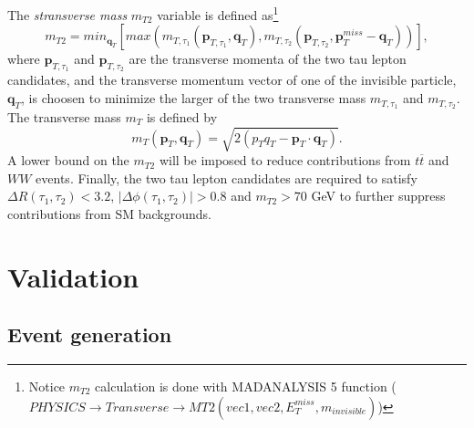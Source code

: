 \documentclass{ws-mpla}
\begin{document}
The \textit{stransverse mass} $m_{T2}$ variable is defined as\footnote{
Notice $m_{T2}$ calculation is done with MADANALYSIS 5 function ($PHYSICS\rightarrow Transverse\rightarrow MT2(vec1,vec2,E^{miss}_T,m_{invisible})$)
}
\begin{equation}
m_{T2} =min_{\mathbf{q}_T}
\left[
max(m_{T,\tau_1}(\mathbf{p}_{T,\tau_1},\mathbf{q}_T),m_{T,\tau_2}(\mathbf{p}_{T,\tau_2},\mathbf{p}^{miss}_T -\mathbf{q}_T))
\right],
\end{equation}   
where $\mathbf{p}_{T,\tau_1}$ and $\mathbf{p}_{T,\tau_2}$ are the transverse momenta of the two tau lepton candidates, and the transverse momentum vector of one of the invisible particle, $\mathbf{q}_T$, is choosen to minimize the larger of the two transverse mass $m_{T,\tau_1}$ and $m_{T,\tau_2}$. The transverse mass $m_T$ is defined by
\begin{equation}
m_{T}(\mathbf{p}_T,\mathbf{q}_T) = \sqrt{2(p_T q_T -\mathbf{p}_T\cdot\mathbf{q}_T)}.
\end{equation} 
A lower bound on the $m_{T2}$ will be imposed to reduce contributions from $t\overline{t}$ and $WW$ events.
Finally, the two tau lepton candidates are required to satisfy $\Delta R(\tau_1,\tau_2) < 3.2$, $|\Delta\phi (\tau_1,\tau_2)| > 0.8$ and $m_{T2} > 70$ GeV to further suppress contributions from SM backgrounds.




\section{Validation}

\subsection{Event generation}
\end{document}
